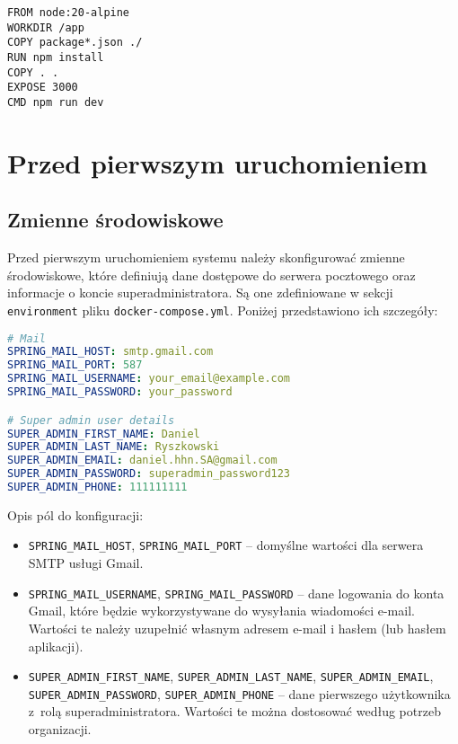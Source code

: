 \begin{lstlisting}[language=docker, caption=Dockerfile frontendu]
FROM node:20-alpine
WORKDIR /app
COPY package*.json ./
RUN npm install
COPY . .
EXPOSE 3000
CMD npm run dev
\end{lstlisting}


\section{Przed pierwszym uruchomieniem}
\subsection{Zmienne środowiskowe}
Przed pierwszym uruchomieniem systemu należy skonfigurować zmienne środowiskowe, które definiują dane dostępowe do serwera pocztowego oraz informacje o koncie superadministratora. Są one zdefiniowane w sekcji \texttt{environment} pliku \texttt{docker-compose.yml}. Poniżej przedstawiono ich szczegóły:

\begin{lstlisting}[language=yaml, caption=Konfiguracja zmiennych środowiskowych]
# Mail
SPRING_MAIL_HOST: smtp.gmail.com
SPRING_MAIL_PORT: 587
SPRING_MAIL_USERNAME: your_email@example.com
SPRING_MAIL_PASSWORD: your_password

# Super admin user details
SUPER_ADMIN_FIRST_NAME: Daniel
SUPER_ADMIN_LAST_NAME: Ryszkowski
SUPER_ADMIN_EMAIL: daniel.hhn.SA@gmail.com
SUPER_ADMIN_PASSWORD: superadmin_password123
SUPER_ADMIN_PHONE: 111111111
\end{lstlisting}

Opis pól do konfiguracji:
\begin{itemize}
    \item \texttt{SPRING\_MAIL\_HOST}, \texttt{SPRING\_MAIL\_PORT} -- domyślne wartości dla serwera SMTP usługi Gmail.
    \item \texttt{SPRING\_MAIL\_USERNAME}, \texttt{SPRING\_MAIL\_PASSWORD} -- dane logowania do konta Gmail, które będzie wykorzystywane do wysyłania wiadomości e-mail. Wartości te należy uzupełnić własnym adresem e-mail i hasłem (lub hasłem aplikacji).
    \item \texttt{SUPER\_ADMIN\_FIRST\_NAME}, \texttt{SUPER\_ADMIN\_LAST\_NAME}, \texttt{SUPER\_ADMIN\_EMAIL}, \texttt{SUPER\_ADMIN\_PASSWORD}, \texttt{SUPER\_ADMIN\_PHONE} -- dane pierwszego użytkownika z~rolą superadministratora. Wartości te można dostosować według potrzeb organizacji.
\end{itemize}

